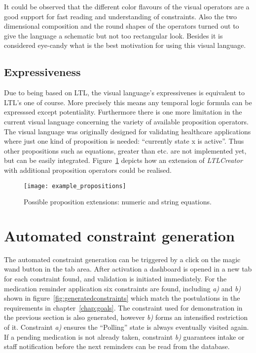It could be observed that the different color flavours of the visual operators are a good support for fast reading and understanding of constraints. Also the two dimensional composition and the round shapes of the operators turned out to give the language a schematic but not too rectangular look. Besides it is considered eye-candy what is the best motivation for using this visual language.





\subsection{Expressiveness}

Due to being based on LTL, the visual language's expressivenes is equivalent to LTL's one of course. More precisely this means any temporal logic formula can be expresssed except potentiality.
Furthermore there is one more limitation in the current visual language concerning the variety of available proposition operators. The visual language was originally designed for validating healthcare applications where just one kind of proposition is needed: ``currently state x is active''. Thus other propositions such as equations, greater than etc. are not implemented yet, but can be easily integrated.
Figure~\ref{fig:example_propositions} depicts how an extension of \emph{LTLCreator} with additional proposition operators could be realised.

\begin{figure}[htbp]
  \centering
  \texttt{[image: example\_propositions]}
  \caption{Possible proposition extensions: numeric and string equations.}
  \label{fig:example_propositions}
\end{figure}



\section{Automated constraint generation}

The automated constraint generation can be triggered by a click on the magic wand button in the tab area. After activation a dashboard is opened in a new tab for each constraint found, and validation is initiated immediately. For the medication reminder application six constraints are found, including \emph{a)} and \emph{b)} shown in figure~\ref{fig:generatedconstraints} which match the postulations in the requirements in chapter~\ref{chap:goals}.
The constraint used for demonstration in the previous section is also generated, however \emph{b)} forms an intensified restriction of it. 
Constraint \emph{a)} ensures the ``Polling'' state is always eventually visited again. If a pending medication is not already taken, constraint \emph{b)} guarantees intake or staff notification before the next reminders can be read from the database.

